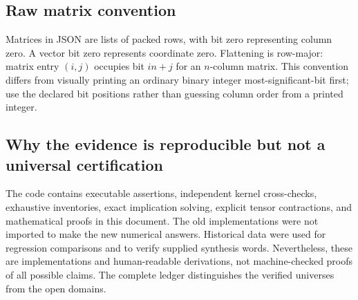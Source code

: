 \documentclass[11pt,a4paper]{article}
\theoremstyle{definition}\newtheorem{definition}[theorem]{Definition}
\begin{document}
\subsection{Raw matrix convention}
Matrices in JSON are lists of packed rows, with bit zero representing column zero. A vector bit zero represents coordinate zero. Flattening is row-major: matrix entry $(i,j)$ occupies bit $i n+j$ for an $n$-column matrix. This convention differs from visually printing an ordinary binary integer most-significant-bit first; use the declared bit positions rather than guessing column order from a printed integer.

\subsection{Why the evidence is reproducible but not a universal certification}
The code contains executable assertions, independent kernel cross-checks, exhaustive inventories, exact implication solving, explicit tensor contractions, and mathematical proofs in this document. The old implementations were not imported to make the new numerical answers. Historical data were used for regression comparisons and to verify supplied synthesis words. Nevertheless, these are implementations and human-readable derivations, not machine-checked proofs of all possible claims. The complete ledger distinguishes the verified universes from the open domains.
\end{document}

